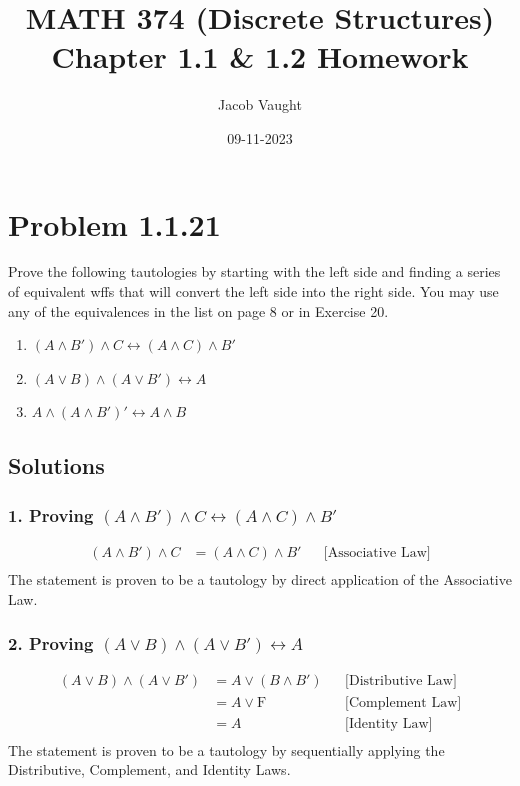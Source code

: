 \documentclass[12pt]{article}
\title{MATH 374 (Discrete Structures)\\Chapter 1.1 \& 1.2 Homework}
\author{Jacob Vaught}
\date{09-11-2023}
\begin{document}
\maketitle

\newpage
\section*{Problem 1.1.21}
Prove the following tautologies by starting with the left side and finding a series of equivalent wffs that will convert the left side into the right side. You may use any of the equivalences in the list on page 8 or in Exercise 20.
\begin{enumerate}
\item $(A \land B') \land C \leftrightarrow (A \land C) \land B'$
\item $(A \lor B) \land (A\lor B') \leftrightarrow A$
\item $A \land (A \land B')' \leftrightarrow A \land B$
\end{enumerate}


\newpage
\subsection*{Solutions}

\subsubsection*{1. Proving $(A \land B') \land C \leftrightarrow (A \land C) \land B'$}

\begin{align*}
(A \land B') \land C &= (A \land C) \land B' && \text{[Associative Law]} \\
\end{align*}
The statement is proven to be a tautology by direct application of the Associative Law.

\subsubsection*{2. Proving $(A \lor B) \land (A \lor B') \leftrightarrow A$}

\begin{align*}
(A \lor B) \land (A \lor B') &= A \lor (B \land B') && \text{[Distributive Law]} \\
&= A \lor \text{F} && \text{[Complement Law]} \\
&= A && \text{[Identity Law]} \\
\end{align*}
The statement is proven to be a tautology by sequentially applying the Distributive, Complement, and Identity Laws.
\end{document}
